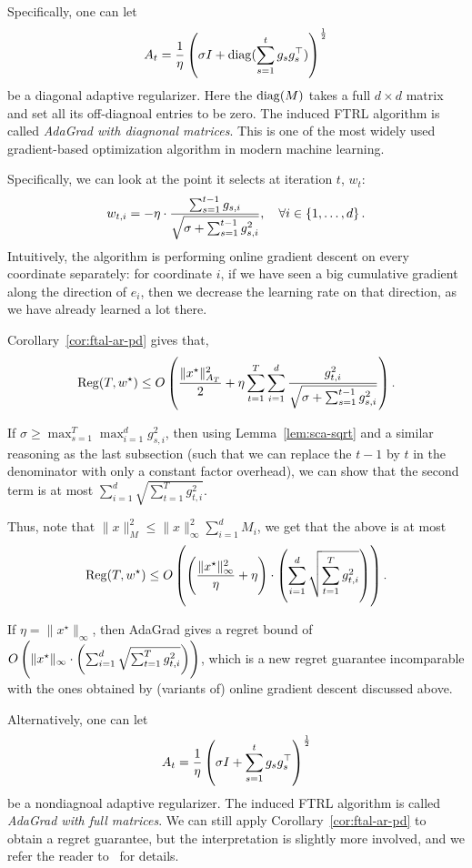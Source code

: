 \documentclass{article}
\DeclareMathOperator*{\diag}{{\rm diag}}
\DeclareMathOperator*{\Reg}{{\rm Reg}}
\begin{document}
Specifically, one can let
\[ A_t = \frac1\eta \del{\sigma I + \diag( \sum_{s=1}^t g_s g_s^\top) }^\frac12\] be a diagonal adaptive regularizer. Here the $\diag(M)$ takes a full $d \times d$ matrix and set all its off-diagnoal entries to be zero.
The induced FTRL algorithm is called {\em AdaGrad with diagnonal matrices}. This is one of the most widely used gradient-based optimization algorithm in modern machine learning.

Specifically, we can look at the point it selects at iteration $t$, $w_t$:
\[ w_{t,i} = -\eta \cdot \frac{\sum_{s=1}^{t-1} g_{s,i}}{\sqrt{\sigma + \sum_{s=1}^{t-1} g_{s,i}^2}}, \quad \forall i \in \cbr{1,\ldots,d}. \]
Intuitively, the algorithm is performing online gradient descent on every coordinate separately: for coordinate $i$, if we have seen a big cumulative gradient along the direction of $e_i$, then we decrease the learning rate on that direction, as we have already learned a lot there.

Corollary~\ref{cor:ftal-ar-pd} gives that,
\[ \Reg(T, w^\star) \leq O\del{ \frac{\| x^\star \|_{A_T}^2}{2} + \eta \sum_{t=1}^T \sum_{i=1}^d \frac{g_{t,i}^2}{\sqrt{\sigma + \sum_{s=1}^{t-1} g_{s,i}^2}}}. \]

If $\sigma \geq \max_{s=1}^T \max_{i=1}^d g_{s,i}^2$, then using Lemma~\ref{lem:sca-sqrt} and a similar reasoning as the last subsection (such that we can replace the $t-1$ by $t$ in the denominator with only a constant factor overhead), we can show that the second term is at most $\sum_{i=1}^d \sqrt{\sum_{t=1}^T g_{t,i}^2}$.

Thus, note that $\| x\|_M^2 \leq \| x \|_\infty^2 \sum_{i=1}^d M_i$, we get that the above is at most
\[ \Reg(T, w^\star) \leq O\del{ \del{\frac{\| x^\star \|_\infty^2}{\eta} + \eta} \cdot \del{\sum_{i=1}^d \sqrt{\sum_{t=1}^T g_{t,i}^2}} }. \]

If $\eta = \| x^\star \|_\infty$, then AdaGrad gives a regret bound of $O\del{ \| x^\star \|_\infty \cdot \del{\sum_{i=1}^d \sqrt{\sum_{t=1}^T g_{t,i}^2}} }$, which is a new regret guarantee incomparable with the ones obtained by (variants of) online gradient descent discussed above.


Alternatively, one can let
\[ A_t = \frac1\eta \del{\sigma I + \sum_{s=1}^t g_s g_s^\top }^\frac12 \]
be a nondiagnoal adaptive regularizer. The induced FTRL algorithm is called {\em AdaGrad with full matrices}. We can still apply Corollary~\ref{cor:ftal-ar-pd} to obtain a regret guarantee, but the interpretation is slightly more involved, and we refer the reader to~\cite[][Section 5.6]{hazan2016introduction} for details.
\end{document}
